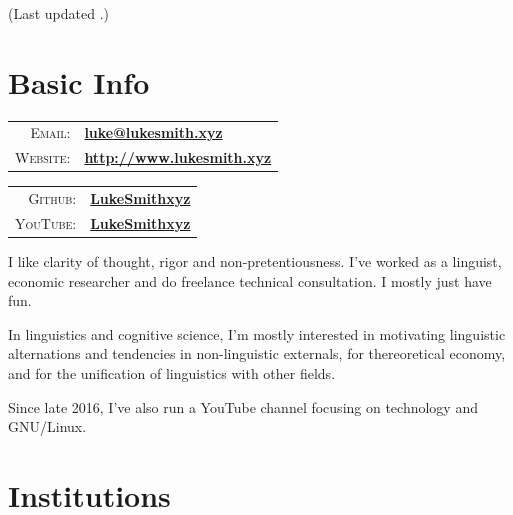 \documentclass[letterpaper,10pt]{article}
\author{Luke Smith}
\date{\today}
\let\oldhref\href
\renewcommand{\href}[2]{\oldhref{#1}{\bfseries#2}}
\renewcommand{\maketitle}{
\par{\centering{\Huge  \textsc{\theauthor}}\par}
{\footnotesize\hfill{}\color{gray}(Last updated \thedate.)}}
\begin{document}
\maketitle

\section{Basic Info}

\vspace{.25cm}

\begin{minipage}[t]{.5\linewidth}

\begin{tabular}{rp{.75\linewidth}}
    \textsc{Email:}     & \href{mailto:luke@lukesmith.xyz}{luke@lukesmith.xyz}\\
    \textsc{Website:}&\href{http://www.lukesmith.xyz}{http://www.lukesmith.xyz}
\end{tabular}
\end{minipage}
\begin{minipage}[t]{.5\linewidth}
\begin{tabular}{rl}
\textsc{Github:} & \href{http://github.com/LukeSmithxyz}{LukeSmithxyz}\\
\textsc{YouTube:}&\href{http://youtube.com/c/LukeSmithxyz}{LukeSmithxyz}
\end{tabular}
\end{minipage}

\vspace{.25cm}

I like clarity of thought, rigor and non-pretentiousness. I've worked as a linguist, economic researcher and do freelance technical consultation. I mostly just have fun.

\vspace{.25cm}

In linguistics and cognitive science, I'm mostly interested in motivating linguistic alternations and tendencies in non-linguistic externals, for thereoretical economy, and for the unification of linguistics with other fields.

\vspace{.25cm}

Since late 2016, I've also run a YouTube channel focusing on technology and GNU/Linux.

\section{Institutions}
\end{document}
